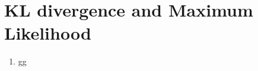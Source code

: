 \documentclass[12pt]{article}
\begin{document}
    \section*{KL divergence and Maximum Likelihood}
    \begin{enumerate}[label=(\alph*)]
        \item  gg
        
    \end{enumerate}
\end{document}
